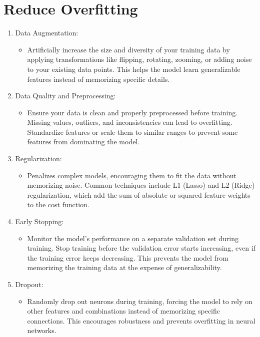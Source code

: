 \section{Reduce Overfitting}
    \begin{enumerate}
        \item Data Augmentation:
            \begin{itemize}
                \item Artificially increase the size and diversity of your training data by applying transformations like flipping, rotating, zooming, or adding noise to your existing data points. This helps the model learn generalizable features instead of memorizing specific details.
            \end{itemize}
        \item Data Quality and Preprocessing:
            \begin{itemize}
                \item Ensure your data is clean and properly preprocessed before training. Missing values, outliers, and inconsistencies can lead to overfitting. Standardize features or scale them to similar ranges to prevent some features from dominating the model.
            \end{itemize}
        \item Regularization:
            \begin{itemize}
                \item Penalizes complex models, encouraging them to fit the data without memorizing noise. Common techniques include L1 (Lasso) and L2 (Ridge) regularization, which add the sum of absolute or squared feature weights to the cost function.
            \end{itemize}
        
        \item Early Stopping:
            \begin{itemize}
                \item Monitor the model's performance on a separate validation set during training. Stop training before the validation error starts increasing, even if the training error keeps decreasing. This prevents the model from memorizing the training data at the expense of generalizability.
            \end{itemize}

        \item Dropout:
            \begin{itemize}
                \item Randomly drop out neurons during training, forcing the model to rely on other features and combinations instead of memorizing specific connections. This encourages robustness and prevents overfitting in neural networks.
            \end{itemize}
        

\end{enumerate}
